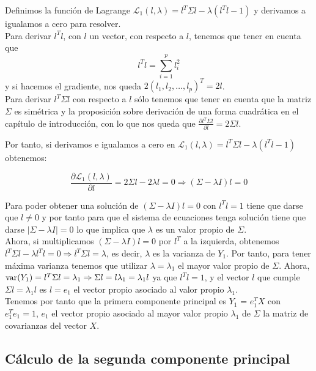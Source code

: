 Definimos la función de Lagrange $\mathcal{L}_1(l, \lambda) = l^T \Sigma l - \lambda(l^Tl - 1)$
y derivamos a igualamos a cero para resolver.\\

Para derivar $l^Tl$, con $l$ un vector, con respecto a $l$, tenemos que tener en cuenta que 
\[	l^Tl = \sum_{i=1}^p l_i^2	\]
y si hacemos el gradiente, nos queda $2(l_1, l_2, \dots, l_p)^T = 2l$.\\

Para derivar $l^T \Sigma l$ con respecto a $l$ sólo tenemos que tener en cuenta que la matriz $\Sigma$ es simétrica y la proposición sobre derivación de una forma cuadrática en el capítulo de introducción, con lo que nos queda que $\frac{\partial l^T \Sigma l}{\partial l} = 2 \Sigma l$.

Por tanto, si derivamos e igualamos a cero en $\mathcal{L}_1(l, \lambda) = l^T \Sigma l - \lambda(l^Tl - 1)$ obtenemos:

\[	\frac{\partial \mathcal{L}_1(l, \lambda)}{\partial l} = 2 \Sigma l - 2 \lambda l = 0 \Rightarrow (\Sigma - \lambda I)l = 0
	\]

Para poder obtener una solución de $(\Sigma - \lambda I)l = 0$ con $l^Tl=1$ tiene que darse que $l \neq 0$ y por tanto para que el sistema de ecuaciones tenga solución tiene que darse $|\Sigma - \lambda I| = 0$ lo que implica que $\lambda$ es un valor propio de $\Sigma$.\\
Ahora, si multiplicamos $(\Sigma - \lambda I)l = 0$ por $l^T$ a la izquierda, obtenemos
$l^T \Sigma l - \lambda l^Tl = 0 \Rightarrow l^T \Sigma l = \lambda$, es decir, $\lambda$ es la varianza de $Y_1$. Por tanto, para tener máxima varianza tenemos que utilizar $\lambda = \lambda_1$ el mayor valor propio de $\Sigma$. Ahora, $\text{var}{(Y_1)} = l^T \Sigma l = \lambda_1 \Rightarrow \Sigma l = l \lambda_1 = \lambda_1 l$ ya que $l^Tl=1$, y el vector $l$ que cumple $\Sigma l = \lambda_1 l$ es $l = e_1$ el vector propio asociado al valor propio $\lambda_1$.\\

Tenemos por tanto que la primera componente principal es $Y_1$ = $e^T_1X$ con $e_1^Te_1 = 1$, $e_1$ el vector propio asociado al mayor valor propio $\lambda_1$ de $\Sigma$ la matriz de covarianzas del vector $X$.

\subsection{Cálculo de la segunda componente principal}

